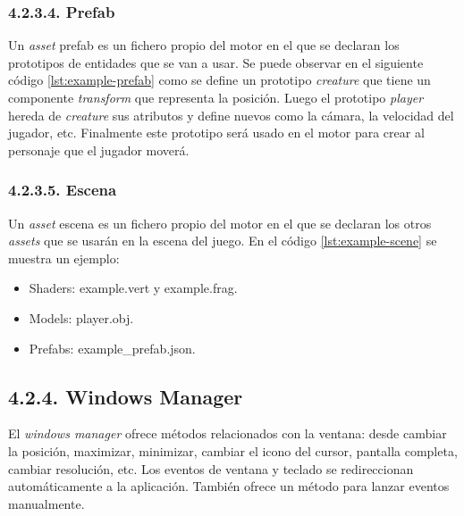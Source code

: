 \subsubsection*{4.2.3.4. Prefab}\label{sec:workflow_managers_assets_prefab}

Un \textit{asset} prefab es un fichero propio del motor en el que se declaran los prototipos de entidades que se van a usar.
Se puede observar en el siguiente código \ref{lst:example-prefab} como se define un prototipo \textit{creature} que tiene
un componente \textit{transform} que representa la posición. Luego el prototipo \textit{player} hereda de \textit{creature}
sus atributos y define nuevos como la cámara, la velocidad del jugador, etc. Finalmente este prototipo será usado en el motor para crear al personaje que el jugador moverá.


\subsubsection*{4.2.3.5. Escena}\label{sec:workflow_managers_assets_scene}

Un \textit{asset} escena es un fichero propio del motor en el que se declaran los otros \textit{assets} que se usarán en la escena del juego.
En el código \ref{lst:example-scene} se muestra un ejemplo:
\begin{itemize}
    \item Shaders: example.vert y example.frag.
    \item Models: player.obj.
    \item Prefabs: example\_prefab.json.
\end{itemize}


\subsection*{4.2.4. Windows Manager}\label{sec:workflow_managers_windows}

El \textit{windows manager} ofrece métodos relacionados con la ventana: desde cambiar la posición, maximizar, minimizar,
cambiar el icono del cursor, pantalla completa, cambiar resolución, etc. Los eventos de ventana y teclado
se redireccionan automáticamente a la aplicación. También ofrece un método para lanzar eventos manualmente.

